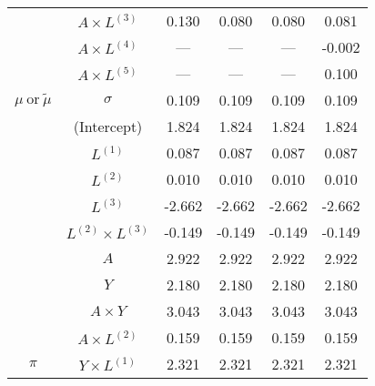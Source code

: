 \begin{table}
\begin{minipage}[t]{0.5\textwidth}
\begin{tabular}[t]{|>{}c|c|c|c|c|>{}c|}
\cline{2-6}
 & $A \times L^{(3)}$ & 0.130 & 0.080 & 0.080 & 0.081\\
\cline{2-6}
 & $A \times L^{(4)}$ & --- & --- & --- & -0.002\\
\cline{2-6}
 & $A \times L^{(5)}$ & --- & --- & --- & 0.100\\
\cline{2-6}
\multirow{-15}{*}{\centering\arraybackslash $\mu~\text{or}~\tilde\mu$} & $\sigma$ & 0.109 & 0.109 & 0.109 & 0.109\\
\cline{1-6}
 & (Intercept) & 1.824 & 1.824 & 1.824 & 1.824\\
\cline{2-6}
 & $L^{(1)}$ & 0.087 & 0.087 & 0.087 & 0.087\\
\cline{2-6}
 & $L^{(2)}$ & 0.010 & 0.010 & 0.010 & 0.010\\
\cline{2-6}
 & $L^{(3)}$ & -2.662 & -2.662 & -2.662 & -2.662\\
\cline{2-6}
 & $L^{(2)} \times L^{(3)}$ & -0.149 & -0.149 & -0.149 & -0.149\\
\cline{2-6}
 & $A$ & 2.922 & 2.922 & 2.922 & 2.922\\
\cline{2-6}
 & $Y$ & 2.180 & 2.180 & 2.180 & 2.180\\
\cline{2-6}
 & $A\times Y$ & 3.043 & 3.043 & 3.043 & 3.043\\
\cline{2-6}
 & $A \times L^{(2)}$ & 0.159 & 0.159 & 0.159 & 0.159\\
\cline{2-6}
\multirow{-10}{*}{\centering\arraybackslash $\pi$} & $Y \times L^{(1)}$ & 2.321 & 2.321 & 2.321 & 2.321\\
\hline
\end{tabular}
\end{minipage}
\begin{minipage}[t]{0.5\textwidth}


\end{minipage}
\end{table}
